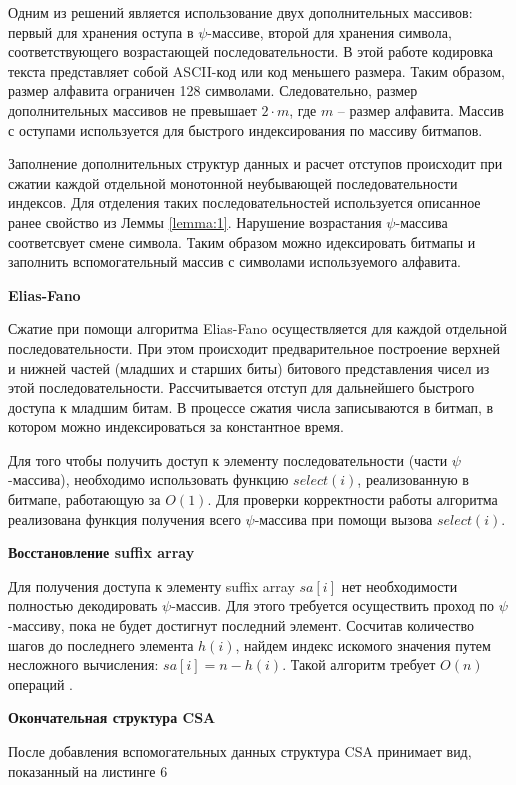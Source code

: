 Одним из решений является использование двух дополнительных массивов:
первый для хранения оступа в $\psi$-массиве, второй для хранения символа,
соответствующего возрастающей последовательности.
В этой работе кодировка текста представляет собой ASCII-код или код меньшего размера.
Таким образом, размер алфавита ограничен 128 символами. Следовательно, размер
дополнительных массивов не превышает $2 \cdot m$, где $m$ -- размер алфавита.
Массив с оступами используется для быстрого индексирования по массиву битмапов.

Заполнение дополнительных структур данных и расчет отступов происходит при сжатии каждой отдельной
монотонной неубывающей последовательности индексов.
Для отделения таких последовательностей используется описанное ранее свойство из Леммы \ref{lemma:1}.
Нарушение возрастания $\psi$-массива соответсвует смене символа. Таким образом можно идексировать
битмапы и заполнить вспомогательный массив с символами используемого алфавита.

\textbf{Elias-Fano}

Сжатие при помощи алгоритма Elias-Fano осуществляется для каждой отдельной последовательности.
При этом происходит предварительное построение верхней и нижней частей (младших и старших биты)
битового представления чисел из этой последовательности. Рассчитывается отступ для дальнейшего
быстрого доступа к младшим битам. В процессе сжатия числа записываются в битмап,
в котором можно индексироваться за константное время.

Для того чтобы получить доступ к элементу последовательности (части $\psi$-массива),
необходимо использовать функцию $select(i)$, реализованную в битмапе, работающую за $O(1)$.
Для проверки корректности работы алгоритма реализована функция получения всего $\psi$-массива
при помощи вызова $select(i)$.

\textbf{Восстановление suffix array}

Для получения доступа к элементу suffix array $sa[i]$ нет необходимости полностью декодировать
$\psi$-массив. Для этого требуется осуществить проход по $\psi$-массиву, пока не будет достигнут
последний элемент. Сосчитав количество шагов до последнего элемента $h(i)$, найдем индекс искомого
значения путем несложного вычисления: $sa[i] = n - h(i)$. Такой алгоритм требует $O(n)$ операций \cite{andersensimple}.

\textbf{Окончательная структура CSA}

После добавления вспомогательных данных структура CSA принимает вид, показанный на листинге 6

